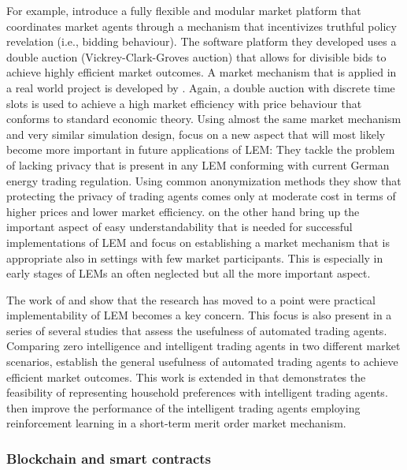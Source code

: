 For example, \citet{Lamparter:2010} introduce a fully flexible and modular market platform that coordinates market agents through a mechanism that incentivizes truthful policy revelation (i.e., bidding behaviour). The software platform they developed uses a double auction (Vickrey-Clark-Groves auction) that allows for divisible bids to achieve highly efficient market outcomes. A market mechanism that is applied in a real world project is developed by \citet{Ilic:2012}. Again, a double auction with discrete time slots is used to achieve a high market efficiency with price behaviour that conforms to standard economic theory. Using almost the same market mechanism and very similar simulation design, \citet{Buchmann:2013} focus on a new aspect that will most likely become more important in future applications of LEM: They tackle the problem of lacking privacy that is present in any LEM conforming with current German energy trading regulation. Using common anonymization methods they show that protecting the privacy of trading agents comes only at moderate cost in terms of higher prices and lower market efficiency. \citet{Rosen:2013} on the other hand bring up the important aspect of easy understandability that is needed for successful implementations of LEM and focus on establishing a market mechanism that is appropriate also in settings with few market participants. This is especially in early stages of LEMs an often neglected but all the more important aspect.

The work of \citet{Buchmann:2013} and \citet{Rosen:2013} show that the research has moved to a point were practical implementability of LEM becomes a key concern. This focus is also present in a series of several studies that assess the usefulness of automated trading agents. Comparing zero intelligence and intelligent trading agents in two different market scenarios, \citet{Mengelkamp:2017:Trading} establish the general usefulness of automated trading agents to achieve efficient market outcomes. This work is extended in \citet{Mengelkamp:2018:Clustering} that demonstrates the feasibility of representing household preferences with intelligent trading agents. \citet{Mengelkamp:2018c} then improve the performance of the intelligent trading agents employing reinforcement learning in a short-term merit order market mechanism.



\subsubsection{Blockchain and smart contracts}

